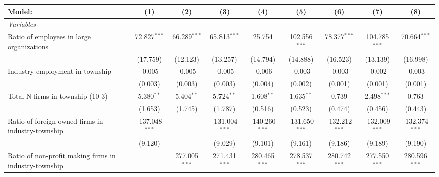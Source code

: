 \begingroup
\centering
\begin{tabular}{lcccccccc}
   \tabularnewline \midrule \midrule
   Model:                                                & (1)              & (2)             & (3)              & (4)              & (5)              & (6)              & (7)              & (8)\\  
   \midrule
   \emph{Variables}\\
   Ratio of employees in large organizations             & 72.827$^{***}$   & 66.289$^{***}$  & 65.813$^{***}$   & 25.754           & 102.556$^{***}$  & 78.377$^{***}$   & 104.785$^{***}$  & 70.664$^{***}$\\   
                                                         & (17.759)         & (12.123)        & (13.257)         & (14.794)         & (14.888)         & (16.523)         & (13.139)         & (16.998)\\   
   Industry employment in township                       & -0.005           & -0.005          & -0.005           & -0.006           & -0.003           & -0.003           & -0.002           & -0.003\\   
                                                         & (0.003)          & (0.003)         & (0.003)          & (0.004)          & (0.002)          & (0.001)          & (0.001)          & (0.001)\\   
   Total N firms in township (10-3)                      & 5.380$^{**}$     & 5.404$^{**}$    & 5.724$^{**}$     & 1.608$^{**}$     & 1.635$^{**}$     & 0.739            & 2.498$^{***}$    & 0.763\\   
                                                         & (1.653)          & (1.745)         & (1.787)          & (0.516)          & (0.523)          & (0.474)          & (0.456)          & (0.443)\\   
   Ratio of foreign owned firms in industry-township     & -137.048$^{***}$ &                 & -131.004$^{***}$ & -140.260$^{***}$ & -131.650$^{***}$ & -132.212$^{***}$ & -132.009$^{***}$ & -132.374$^{***}$\\   
                                                         & (9.120)          &                 & (9.029)          & (9.101)          & (9.161)          & (9.186)          & (9.189)          & (9.190)\\   
   Ratio of non-profit making firms in industry-township &                  & 277.005$^{***}$ & 271.431$^{***}$  & 280.465$^{***}$  & 278.537$^{***}$  & 280.742$^{***}$  & 277.550$^{***}$  & 280.596$^{***}$\\   

\end{tabular}
